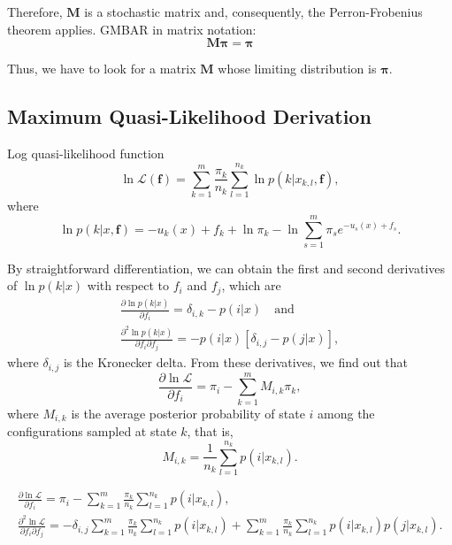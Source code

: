 \documentclass[aip,jcp,reprint,amsmath,amssymb]{revtex4-1}
\newcommand{\mt}[1]{\boldsymbol{\mathbf{#1}}}           %
\newcommand{\vt}[1]{\boldsymbol{\mathbf{#1}}}           %
\begin{document}
Therefore, $\vt M$ is a stochastic matrix and, consequently, the Perron-Frobenius theorem applies. GMBAR in matrix notation:
\begin{equation*}
\mt M \vt \pi = \vt \pi
\end{equation*}

Thus, we have to look for a matrix $\mt M$ whose limiting distribution is $\vt \pi$.

\subsection{Maximum Quasi-Likelihood Derivation}

Log quasi-likelihood function\cite{Geyer_1992, Geyer_1994}
\begin{equation}
\label{eq:gmbar log quasi-likelihood}
\ln \mathcal L(\vt f) = \sum_{k=1}^m \frac{\pi_k}{n_k} \sum_{l=1}^{n_k} \ln p(k|x_{k,l},\vt f),
\end{equation}
where
\begin{equation*}
\ln p(k|x,\vt f) = -u_k(x) + f_k + \ln \pi_k - \ln \sum_{s=1}^m \pi_s e^{-u_s(x) + f_s}.
\end{equation*}

By straightforward differentiation, we can obtain the first and second derivatives of $\ln p(k|x)$ with respect to $f_i$ and $f_j$, which are
\begin{gather*}
\frac{\partial \ln p(k|x)}{\partial f_i} = \delta_{i,k} - p(i|x) \quad \text{and} \\
\frac{\partial^2\ln p(k|x)}{\partial f_i \partial f_j} = -p(i|x)[\delta_{i,j} - p(j|x)],
\end{gather*}
where $\delta_{i,j}$ is the Kronecker delta. From these derivatives, we find out that
\begin{equation*}
\frac{\partial \ln \mathcal L}{\partial f_i} = \pi_i - \sum_{k=1}^m M_{i,k} \pi_k,
\end{equation*}
where $M_{i,k}$ is the average posterior probability of state $i$ among the configurations sampled at state $k$, that is,
\begin{equation*}
M_{i,k} = \frac{1}{n_k} \sum_{l=1}^{n_k} p(i|x_{k,l}).
\end{equation*}


\begin{gather*}
\frac{\partial \ln \mathcal L}{\partial f_i} = \pi_i - \sum_{k=1}^m \frac{\pi_k}{n_k} \sum_{l=1}^{n_k} p(i|x_{k,l}), \\
\frac{\partial^2 \ln \mathcal L}{\partial f_i \partial f_j} = -\delta_{i,j} \sum_{k=1}^m \frac{\pi_k}{n_k} \sum_{l=1}^{n_k} p(i|x_{k,l}) + \sum_{k=1}^m \frac{\pi_k}{n_k} \sum_{l=1}^{n_k} p(i|x_{k,l})p(j|x_{k,l}).
\end{gather*}
\end{document}
